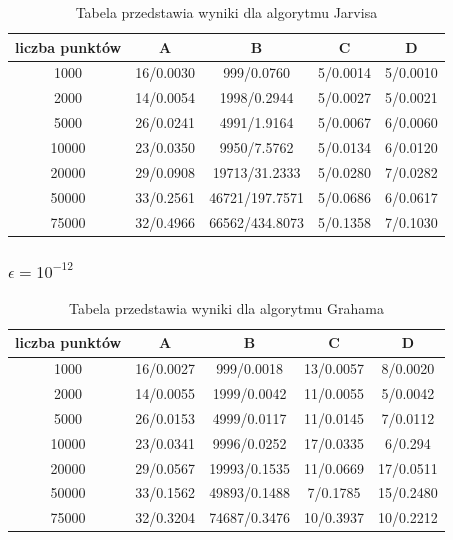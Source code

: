 \documentclass[12pt, a4paper]{article}
\begin{document}
\begin{table}[h]
    \centering
    \begin{tabular}{|c||c|c|c|c|}
        \hline
        liczba punktów & A & B & C & D \\
        \hline\hline
        1000 & 16/0.0030 & 999/0.0760 & 5/0.0014 & 5/0.0010\\
        \hline
        2000 & 14/0.0054 & 1998/0.2944 & 5/0.0027 & 5/0.0021\\
        \hline
        5000 & 26/0.0241 & 4991/1.9164 & 5/0.0067 & 6/0.0060\\
        \hline
        10000 & 23/0.0350 & 9950/7.5762 & 5/0.0134 & 6/0.0120\\
        \hline
        20000 & 29/0.0908 & 19713/31.2333 & 5/0.0280 & 7/0.0282\\
        \hline
        50000 & 33/0.2561 & 46721/197.7571 & 5/0.0686 & 6/0.0617\\
        \hline
        75000 & 32/0.4966 & 66562/434.8073 & 5/0.1358 & 7/0.1030\\
        \hline 
    \end{tabular}
    \caption{Tabela przedstawia wyniki dla algorytmu Jarvisa}
    \label{Jarvis_normalny}
\end{table}
\clearpage
\subsubsection{$\epsilon = 10^{-12}$}
\begin{table}[h]
    \centering
    \begin{tabular}{|c||c|c|c|c|}
        \hline
        liczba punktów & A & B & C & D \\
        \hline\hline
        1000 & 16/0.0027 & 999/0.0018 & 13/0.0057 & 8/0.0020\\
        \hline
        2000 & 14/0.0055 & 1999/0.0042 & 11/0.0055 & 5/0.0042\\
        \hline
        5000 & 26/0.0153 & 4999/0.0117 & 11/0.0145 & 7/0.0112\\
        \hline
        10000 & 23/0.0341 & 9996/0.0252 & 17/0.0335 & 6/0.294\\
        \hline
        20000 & 29/0.0567 & 19993/0.1535 & 11/0.0669 & 17/0.0511\\
        \hline
        50000 & 33/0.1562 & 49893/0.1488 & 7/0.1785 & 15/0.2480\\
        \hline
        75000 & 32/0.3204 & 74687/0.3476 & 10/0.3937 & 10/0.2212\\
        \hline 
    \end{tabular}
    \caption{Tabela przedstawia wyniki dla algorytmu Grahama}
    \label{Graham_zepsuty}
\end{table}
\end{document}
